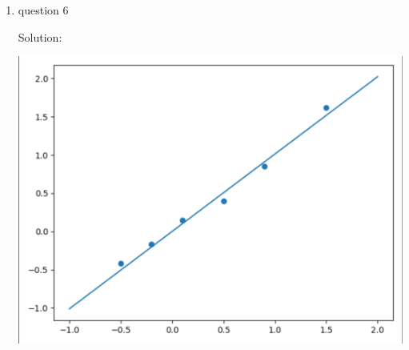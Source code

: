 \documentclass[12pt]{article}
\newcommand{\solu}{{\color{blue} Solution:}}
\begin{document}
\begin{enumerate}
\begin{enumerate}
          \end{enumerate}

          
          
          \item question 6
          
          \solu

          \includegraphics[scale=0.6]{q6.png}
          

\end{enumerate}
\end{document}
